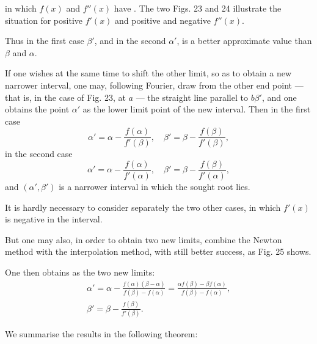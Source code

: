 in which $f(x)$ and $f''(x)$ have . The
two Figs. 23 and 24 illustrate the situation for positive
$f'(x)$ and positive and negative $f''(x)$.

Thus in the first case $\beta'$, and in the second $\alpha'$, is a better
approximate value than $\beta$ and $\alpha$.

If one wishes at the same time to shift the other limit, so as
to obtain a new narrower interval, one may, following
Fourier, draw from the other end point — that is, in the case of Fig. 23,
at $a$ — the straight line parallel to $b\beta'$, and one obtains the
point $\alpha'$ as the lower limit point of the new interval. Then
in the first case
\[
\alpha' = \alpha - \frac{f(\alpha)}{f'(\beta)}, \quad \beta' = \beta - \frac{f(\beta)}{f'(\beta)},
\]
in the second case
\[
\alpha' = \alpha - \frac{f(\alpha)}{f'(\alpha)}, \quad \beta' = \beta - \frac{f(\beta)}{f'(\alpha)},
\]
and $(\alpha', \beta')$ is a narrower interval in which the sought root lies.


It is hardly necessary to consider
separately the two other cases, in
which $f'(x)$ is negative in the
interval.

But one may also, in order to obtain
two new limits, combine the Newton
method with the interpolation method,
with still better success, as Fig. 25 shows.

One then obtains as the two
new limits:
\[
\begin{gathered}
\alpha' = \alpha - \frac{f(\alpha)(\beta - \alpha)}{f(\beta) - f(\alpha)} = \frac{\alpha f(\beta) - \beta f(\alpha)}{f(\beta) - f(\alpha)}, \\
\beta' = \beta - \frac{f(\beta)}{f'(\beta)}.
\end{gathered}
\]

We summarise the results in the following theorem:

